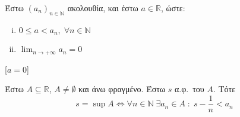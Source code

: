 \begin{mypropbox}
  Έστω $ (a_{n})_{n \in \mathbb{N}} $ ακολουθία, και έστω $ a \in \mathbb{R} $, ώστε:
  \vspace{\baselineskip}
  \begin{minipage}{0.3\textwidth}
    \begin{enumerate}[(i)]
      \item $ 0 \leq a < a_{n}, \; \forall n \in \mathbb{N} $ \hfill {}
      \item $ \lim_{n \to +\infty} a_{n} = 0 $ \hfill {}
    \end{enumerate}
    [$ a = 0 $]
  \end{minipage}
\end{mypropbox}

\begin{mypropbox}
  Έστω $ A \subseteq \mathbb{R} $, $ A \neq \emptyset $ και άνω φραγμένο. 
  Έστω $ s $ α.φ.\ του $A$. Τότε 
  \[
    s = \sup A \Leftrightarrow \forall n \in \mathbb{N} \; \exists a_{n} \in A
    \; : \; s - \frac{1}{n} < a_{n} 
  \]
\end{mypropbox}

